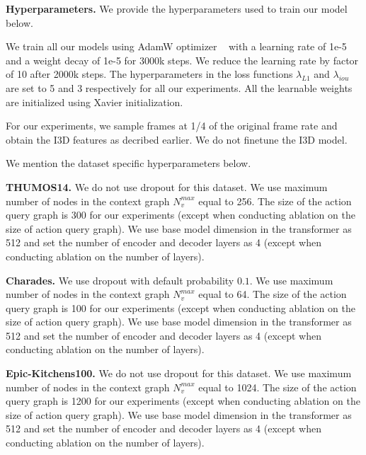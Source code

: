\documentclass[10pt,twocolumn,letterpaper]{article}
\begin{document}
\vspace{0.05in}
\noindent
\textbf{Hyperparameters.} We provide the hyperparameters used to train our model below.

We train all our models using AdamW optimizer ~\cite{loshchilov2017decoupled} with a learning rate of 1e-5 and a weight decay of 1e-5 for 3000k steps. We reduce the learning rate by factor of 10 after 2000k steps. The hyperparameters in the loss functions $\lambda_{L1}$ and $\lambda_{iou}$ are set to 5 and 3 respectively for all our experiments. All the learnable weights are initialized using Xavier initialization. 

For our experiments, we sample frames at 1/4 of the original frame rate and obtain the I3D features as decribed earlier. We do not finetune the I3D model.

We mention the dataset specific hyperparameters below.

\noindent \textbf{THUMOS14. } We do not use dropout for this dataset. We use maximum number of nodes in the context graph $N_{v}^{max}$ equal to 256. The size of the action query graph is 300 for our experiments (except when conducting ablation on the size of action query graph). We use base model dimension in the transformer as 512 and set the number of encoder and decoder layers as 4 (except when conducting ablation on the number of layers).

\textbf{Charades. } We use dropout with default probability $0.1$. We use maximum number of nodes in the context graph $N_{v}^{max}$ equal to 64. The size of the action query graph is 100 for our experiments (except when conducting ablation on the size of action query graph). We use base model dimension in the transformer as 512 and set the number of encoder and decoder layers as 4 (except when conducting ablation on the number of layers).

\textbf{Epic-Kitchens100. }We do not use dropout for this dataset. We use maximum number of nodes in the context graph $N_{v}^{max}$ equal to 1024. The size of the action query graph is 1200 for our experiments (except when conducting ablation on the size of action query graph). We use base model dimension in the transformer as 512 and set the number of encoder and decoder layers as 4 (except when conducting ablation on the number of layers).






 
 
\end{document}
